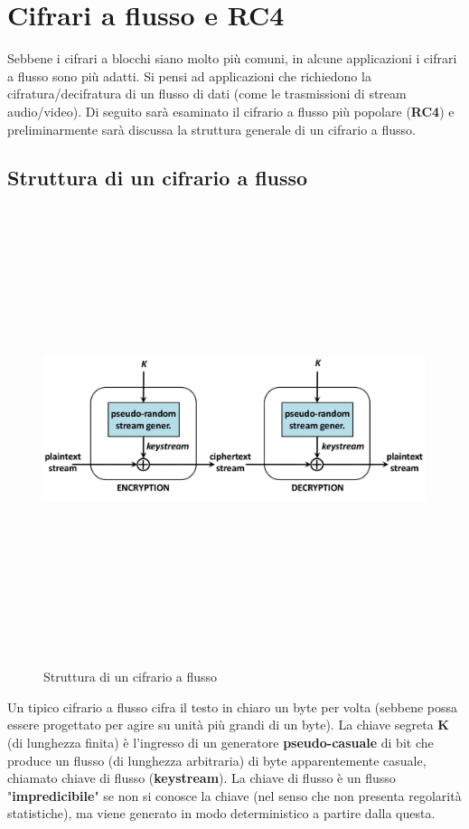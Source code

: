 \section{Cifrari a flusso e RC4}
Sebbene i cifrari a blocchi siano molto più comuni, in alcune applicazioni i cifrari a flusso sono più adatti. Si pensi ad applicazioni che richiedono la cifratura/decifratura di un flusso di dati (come le trasmissioni di stream audio/video). Di seguito sarà esaminato il cifrario a flusso più popolare (\textbf{RC4}) e  preliminarmente sarà discussa la struttura generale di un cifrario a flusso.

\subsection{Struttura di un cifrario a flusso}
\begin{figure}[htbp]
	\centering%
	\subfigure%
	{\includegraphics[height=13cm, width=13cm, keepaspectratio]{Immagini/chiave_segreta/flusso_struct.png}}
	\caption{Struttura di un cifrario a flusso \label{fig:flusso_struct}} 	
\end{figure}

Un tipico cifrario a flusso cifra il testo in chiaro un byte per volta (sebbene possa essere progettato per agire su unità più grandi di un byte). La chiave segreta \textbf{K} (di lunghezza finita) è l'ingresso di un generatore \textbf{pseudo-casuale} di bit che produce un flusso (di lunghezza arbitraria) di byte apparentemente casuale, chiamato chiave di flusso (\textbf{keystream}). La chiave di flusso è un flusso "\textbf{impredicibile}" se non si conosce la chiave (nel senso che non presenta regolarità statistiche), ma viene generato in modo deterministico a partire dalla questa. \\

